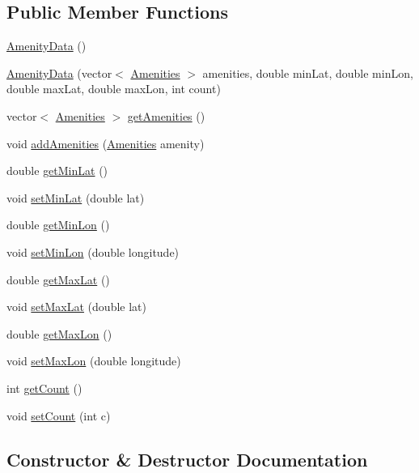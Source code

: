 \subsection*{Public Member Functions}
\begin{DoxyCompactItemize}
\item 
\hyperlink{class_amenity_data_a97638919f4c3c435f28436130998902f}{Amenity\+Data} ()
\item 
\hyperlink{class_amenity_data_a8934aff7ce6cd148159b5a150dc5c4f9}{Amenity\+Data} (vector$<$ \hyperlink{class_amenities}{Amenities} $>$ amenities, double min\+Lat, double min\+Lon, double max\+Lat, double max\+Lon, int count)
\item 
vector$<$ \hyperlink{class_amenities}{Amenities} $>$ \hyperlink{class_amenity_data_a634841fb7bdd634e6820c06ec4aaa22e}{get\+Amenities} ()
\item 
void \hyperlink{class_amenity_data_a137cde3c490e6522c9bb266723b845c3}{add\+Amenities} (\hyperlink{class_amenities}{Amenities} amenity)
\item 
double \hyperlink{class_amenity_data_a815a379eaba975a1c413efecef3c236a}{get\+Min\+Lat} ()
\item 
void \hyperlink{class_amenity_data_a49fd48c6e7a7d69d7e9663c859455197}{set\+Min\+Lat} (double lat)
\item 
double \hyperlink{class_amenity_data_ad2ce802524f9da99438d12e4dc7378d5}{get\+Min\+Lon} ()
\item 
void \hyperlink{class_amenity_data_a30d97355d69c87826da300d87afc85c8}{set\+Min\+Lon} (double longitude)
\item 
double \hyperlink{class_amenity_data_a14de1667bc8d9196b66d725a322e9df3}{get\+Max\+Lat} ()
\item 
void \hyperlink{class_amenity_data_a296fe3b55d370c3281d08d9b2c9f2c42}{set\+Max\+Lat} (double lat)
\item 
double \hyperlink{class_amenity_data_a37a5f564a6500698778783edacce1e38}{get\+Max\+Lon} ()
\item 
void \hyperlink{class_amenity_data_a5df67f0745f59cda002d7924f7ec545c}{set\+Max\+Lon} (double longitude)
\item 
int \hyperlink{class_amenity_data_a93e84a15fcfd8a2833179c697ced29ae}{get\+Count} ()
\item 
void \hyperlink{class_amenity_data_af38edfbab9c7fd465fe8fd4e1aae50c8}{set\+Count} (int c)
\end{DoxyCompactItemize}


\subsection{Constructor \& Destructor Documentation}
\mbox{\label{class_amenity_data_a97638919f4c3c435f28436130998902f}} 
